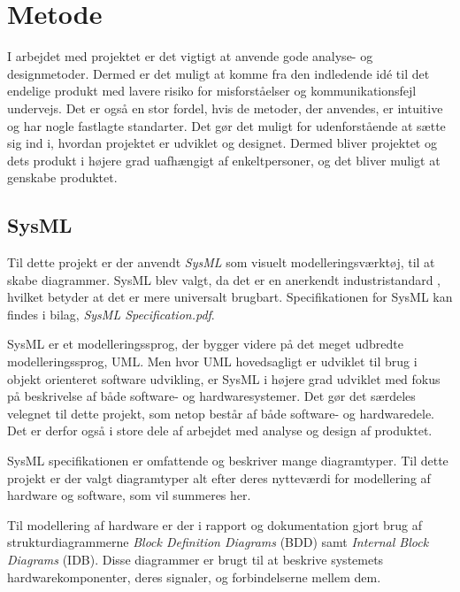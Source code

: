 \chapter{Metode}
I arbejdet med projektet er det vigtigt at anvende gode analyse- og designmetoder. Dermed er det muligt at komme fra den indledende idé til det endelige produkt med lavere risiko for misforståelser og kommunikationsfejl undervejs. Det er også en stor fordel, hvis de metoder, der anvendes, er intuitive og har nogle fastlagte standarter. Det gør det muligt for udenforstående at sætte sig ind i, hvordan projektet er udviklet og designet. Dermed bliver projektet og dets produkt i højere grad uafhængigt af enkeltpersoner, og det bliver muligt at genskabe produktet.

\section{SysML}
Til dette projekt er der anvendt \textit{SysML} som visuelt modelleringsværktøj, til at skabe diagrammer. SysML blev valgt, da det er en anerkendt industristandard\cite{website:SysML} , hvilket betyder at det er mere universalt brugbart. Specifikationen for SysML kan findes i bilag, \textit{SysML Specification.pdf}. \newline 

\noindent SysML er et modelleringssprog, der bygger videre på det meget udbredte modelleringssprog, UML. Men hvor UML hovedsagligt er udviklet til brug i objekt orienteret software udvikling, er SysML i højere grad udviklet med fokus på beskrivelse af både software- og hardwaresystemer. Det gør det særdeles velegnet til dette projekt, som netop består af både software- og hardwaredele. Det er derfor også i store dele af arbejdet med analyse og design af produktet. \newline

\noindent SysML specifikationen er omfattende og beskriver mange diagramtyper. Til dette projekt er der valgt diagramtyper alt efter deres nytteværdi for modellering af hardware og software, som vil summeres her.\newline

\noindent Til modellering af hardware er der i rapport og dokumentation gjort brug af strukturdiagrammerne \textit{Block Definition Diagrams} (BDD) samt \textit{Internal Block Diagrams} (IDB). Disse diagrammer er brugt til at beskrive systemets hardwarekomponenter, deres signaler, og forbindelserne mellem dem.\newline

